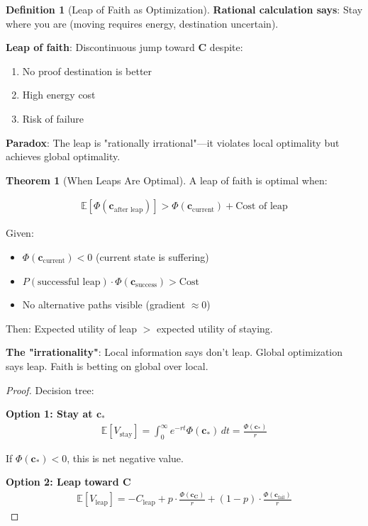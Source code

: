 \documentclass[11pt,a4paper]{article}
\theoremstyle{definition}
\newtheorem{definition}{Definition}[section]
\newtheorem{theorem}{Theorem}[section]
\theoremstyle{remark}
\newcommand{\cc}{\mathbf{c}}
\begin{document}
\begin{small}
\begin{enumerate}
\begin{definition}[Leap of Faith as Optimization]
\textbf{Rational calculation says}: Stay where you are (moving requires energy, destination uncertain).

\textbf{Leap of faith}: Discontinuous jump toward \(\mathbf{C}\) despite:
\begin{enumerate}
    \item No proof destination is better
    \item High energy cost
    \item Risk of failure
\end{enumerate}

\textbf{Paradox}: The leap is "rationally irrational"—it violates local optimality but achieves global optimality.
\end{definition}

\begin{theorem}[When Leaps Are Optimal]
A leap of faith is optimal when:

\begin{align}
\mathbb{E}[\Phi(\cc_{\text{after leap}})] > \Phi(\cc_{\text{current}}) + \text{Cost of leap}
\end{align}

Given:
\begin{itemize}
    \item \(\Phi(\cc_{\text{current}}) < 0\) (current state is suffering)
    \item \(P(\text{successful leap}) \cdot \Phi(\cc_{\text{success}}) > \text{Cost}\)
    \item No alternative paths visible (gradient \(\approx 0\))
\end{itemize}

Then: Expected utility of leap \(>\) expected utility of staying.

\textbf{The "irrationality"}: Local information says don't leap. Global optimization says leap. Faith is betting on global over local.
\end{theorem}

\begin{proof}
Decision tree:

\textbf{Option 1: Stay at \(\cc_*\)}
\begin{align}
\mathbb{E}[V_{\text{stay}}] = \int_0^\infty e^{-rt} \Phi(\cc_*) \, dt = \frac{\Phi(\cc_*)}{r}
\end{align}

If \(\Phi(\cc_*) < 0\), this is net negative value.

\textbf{Option 2: Leap toward \(\mathbf{C}\)}
\begin{align}
\mathbb{E}[V_{\text{leap}}] = -C_{\text{leap}} + p \cdot \frac{\Phi(\cc_{\mathbf{C}})}{r} + (1-p) \cdot \frac{\Phi(\cc_{\text{fail}})}{r}
\end{align}


\end{proof}
\end{enumerate}
\end{small}
\end{document}

